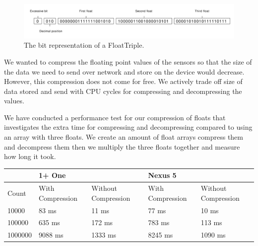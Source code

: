 \begin{figure}[!htbp]
    \centering
    \includegraphics[width=\textwidth]{graphic/data_modeling/float_triple_bit.pdf}
    \caption{The bit representation of a FloatTriple.}
    \label{fig:float_triple_bit}
\end{figure}
We wanted to compress the floating point values of the sensors so that the size of the data we need to send over network and store on the device would decrease. However, this compression does not come for free. We actively trade off size of data stored and send with CPU cycles for compressing and decompressing the values. 

We have conducted a performance test for our compression of floats that investigates the extra time for compressing and decompressing compared to using an array with three floats. We create an amount of float arrays compress them and decompress them then we multiply the three floats together and measure how long it took.

\begin{table}
    \begin{tabular}{|l|l|l|l|l|}
    \hline
    ~       & 1+ One           & ~                   & Nexus 5          & ~                   \\ \hline
    Count   & With Compression & Without Compression & With Compression & Without Compression \\ \hline
    10000   & 83 ms            & 11 ms               & 77 ms            & 10 ms               \\ \hline
    100000  & 635 ms           & 172 ms              & 783 ms           &  113 ms             \\ \hline
    1000000 & 9088 ms          & 1333 ms             & 8245 ms          & 1090 ms             \\ \hline
    \end{tabular}
\end{table}